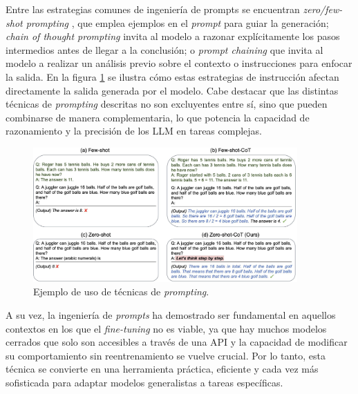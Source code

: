 Entre las estrategias comunes de ingeniería de prompts se encuentran \textit{zero/few-shot prompting} \cite{brown2020language}\cite{kojima2022large},
que emplea ejemplos en el \textit{prompt} para guiar la generación; \textit{chain of thought prompting} \cite{wei2022chain} invita al modelo a razonar explícitamente
los pasos intermedios antes de llegar a la conclusión; o \textit{prompt chaining} \cite{promptchaining2023} que invita al modelo a realizar un análisis previo
sobre el contexto o instrucciones para enfocar la salida.
En la figura \ref{fig:prompting} se ilustra cómo estas estrategias de instrucción afectan directamente la salida generada por el modelo.
Cabe destacar que las distintas técnicas de \textit{prompting} descritas no son excluyentes entre sí,
sino que pueden combinarse de manera complementaria, lo que potencia la capacidad de razonamiento
y la precisión de los LLM en tareas complejas.
\begin{figure}[htbp]
	\centering
	\includegraphics[width=0.9\textwidth]{./Figures/prompting.png}
	\caption{Ejemplo de uso de técnicas de \textit{prompting}.}
	\label{fig:prompting}
\end{figure}

A su vez, la ingeniería de \textit{prompts} ha demostrado ser fundamental en aquellos contextos en los que
el \textit{fine-tuning} no es viable, ya que hay muchos modelos cerrados que solo son accesibles a través de una API
y la capacidad de modificar su comportamiento sin reentrenamiento se vuelve crucial.
Por lo tanto, esta técnica se convierte en una herramienta práctica, eficiente y cada vez más sofisticada
para adaptar modelos generalistas a tareas específicas.


